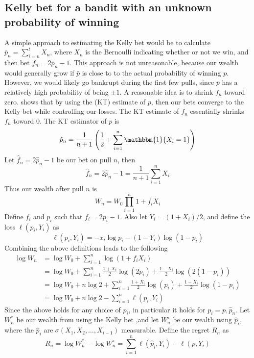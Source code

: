 \documentclass[letterpaper]{article}
\numberwithin{equation}{section}
\theoremstyle{plain}
\begin{document}
\subsection{Kelly bet for a bandit with an unknown probability of winning}\label{kelly_unknown_prob}
A simple approach to estimating the Kelly bet would be to calculate $\bar{p}_n = \sum_{i=n}^t X_n$, where $X_n$ is the Bernoulli indicating whether or not we win, and then bet $f_n=2\bar{p}_n-1$. This approach is not unreasonable, because our wealth would  generally grow if $\bar{p}$ is close to to the actual probability of winning $p$. However, we would likely go bankrupt during the first few pulls, since $\bar{p}$ has a relatively high probability of being $\pm 1$. A reasonable idea is to shrink $f_n$ toward zero. \cite{orabona2016coin} shows that by using the \cite{krichevsky1981performance} (KT) estimate of $p$, then our bets converge to the Kelly bet while controlling our losses. The KT estimate of $f_n$ essentially shrinks $f_n$ toward 0. The KT estimator of $p$ is
\begin{equation}
\hat{p}_n = \frac{1}{n+1}\left(\frac{1}{2} + \sum_{i=1}^n \mathbbm{1}\{X_i = 1\} \right)
\end{equation}
Let $\hat{f}_n=2\hat{p}_n-1$ be our bet on pull $n$, then
\begin{equation}
\hat{f}_n = 2\hat{p}_n-1 = \frac{1}{n+1}\sum_{i=1}^n X_i
\end{equation}
Thus our wealth after pull $n$ is
\begin{equation}
W_n = W_0\prod_{i=1}^n 1+f_i X_i
\end{equation}
Define $f_i$ and $p_i$ such that $f_i = 2p_i - 1$. Also let $Y_i = (1+X_i)/2$, and define the loss $\ell(p_i,Y_i)$ as
\begin{equation}\label{ell_loss}
\ell(p_i,Y_i) = -x_i\log p_i - (1-Y_i)\log(1-p_i)
\end{equation}
Combining the above definitions leads to the following
\begin{align}
\log W_n &= \log W_0 + \sum_{i=1}^n \log(1+f_i X_i)\\
&= \log W_0 + \sum_{i=1}^n \frac{1+X_i}{2} \log(2 p_i) + \frac{1-X_i}{2}\log(2(1-p_i))\\
&= \log W_0 + n\log 2 + \sum_{i=1}^n \frac{1+X_i}{2}\log(p_i) + \frac{1-X_i}{2}\log(1-p_i)\\
&= \log W_0 + n\log 2 - \sum_{i=1}^n \ell(p_i,Y_i)
\end{align}
Since the above holds for any choice of $p_i$, in particular it holds for $p_i=p,\hat{p}_n$. Let $W_n^*$ be our wealth from using the Kelly bet ,and let $W_n^\circ$ be our wealth using $\hat{p}_i$, where the $\hat{p}_i$ are $\sigma(X_1,X_2,\ldots,X_{i-1})$ measurable. Define the regret $R_n$ as
\begin{equation}
R_n = \log W_n^* - \log W_n^\circ = \sum_{i=1}^n \ell(\hat{p}_i,Y_i) - \ell(p,Y_i)
\end{equation}
\end{document}
